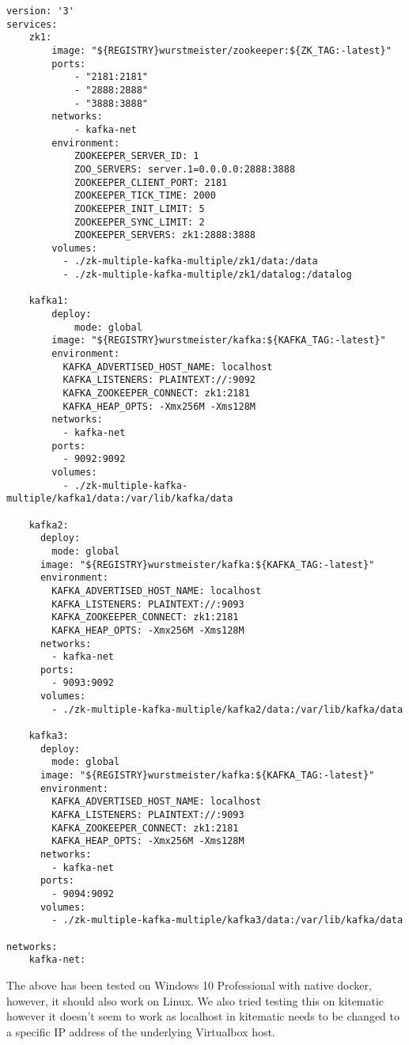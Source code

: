 \begin{verbatim}
version: '3'
services:
    zk1:
        image: "${REGISTRY}wurstmeister/zookeeper:${ZK_TAG:-latest}"
        ports:
            - "2181:2181"
            - "2888:2888"
            - "3888:3888"
        networks:
            - kafka-net
        environment:
            ZOOKEEPER_SERVER_ID: 1
            ZOO_SERVERS: server.1=0.0.0.0:2888:3888
            ZOOKEEPER_CLIENT_PORT: 2181
            ZOOKEEPER_TICK_TIME: 2000
            ZOOKEEPER_INIT_LIMIT: 5
            ZOOKEEPER_SYNC_LIMIT: 2
            ZOOKEEPER_SERVERS: zk1:2888:3888
        volumes:
          - ./zk-multiple-kafka-multiple/zk1/data:/data
          - ./zk-multiple-kafka-multiple/zk1/datalog:/datalog

    kafka1:
        deploy:
            mode: global
        image: "${REGISTRY}wurstmeister/kafka:${KAFKA_TAG:-latest}"
        environment:
          KAFKA_ADVERTISED_HOST_NAME: localhost
          KAFKA_LISTENERS: PLAINTEXT://:9092
          KAFKA_ZOOKEEPER_CONNECT: zk1:2181
          KAFKA_HEAP_OPTS: -Xmx256M -Xms128M
        networks:
          - kafka-net
        ports:
          - 9092:9092
        volumes:
          - ./zk-multiple-kafka-multiple/kafka1/data:/var/lib/kafka/data

    kafka2:
      deploy:
        mode: global
      image: "${REGISTRY}wurstmeister/kafka:${KAFKA_TAG:-latest}"
      environment:
        KAFKA_ADVERTISED_HOST_NAME: localhost
        KAFKA_LISTENERS: PLAINTEXT://:9093
        KAFKA_ZOOKEEPER_CONNECT: zk1:2181
        KAFKA_HEAP_OPTS: -Xmx256M -Xms128M
      networks:
        - kafka-net
      ports:
        - 9093:9092
      volumes:
        - ./zk-multiple-kafka-multiple/kafka2/data:/var/lib/kafka/data

    kafka3:
      deploy:
        mode: global
      image: "${REGISTRY}wurstmeister/kafka:${KAFKA_TAG:-latest}"
      environment:
        KAFKA_ADVERTISED_HOST_NAME: localhost
        KAFKA_LISTENERS: PLAINTEXT://:9093
        KAFKA_ZOOKEEPER_CONNECT: zk1:2181
        KAFKA_HEAP_OPTS: -Xmx256M -Xms128M
      networks:
        - kafka-net
      ports:
        - 9094:9092
      volumes:
        - ./zk-multiple-kafka-multiple/kafka3/data:/var/lib/kafka/data

networks:
    kafka-net:
\end{verbatim}

The above has been tested on Windows 10 Professional with native docker, however, it should also work on Linux. We also tried testing this on kitematic however it doesn't seem to work as localhost in kitematic needs to be changed to a specific IP address of the underlying Virtualbox host.